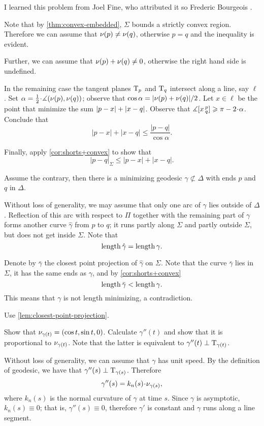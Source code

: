  I learned this problem from Joel Fine, who attributed it so Frederic Bourgeois \cite{fine}.

Note that by \ref{thm:convex-embedded}, $\Sigma$ bounds a strictly convex region.
Therefore we can assume that $\nu(p)\ne\nu(q)$, otherwise $p=q$ and the inequality is evident.

Further, we can assume that $\nu(p)+\nu(q)\ne 0$, otherwise the right hand side is undefined.


In the remaining case the tangent planes $\mathrm{T}_p$ and $\mathrm{T}_q$ intersect along a line, say $\ell$.
Set $\alpha=\tfrac12\cdot\measuredangle(\Norm(p),\Norm(q))$;
observe that $\cos\alpha= |\nu(p)+\nu(q)|/2$.
Let $x\in \ell$ be the point that minimize the sum $|p-x|\z+|x-q|$.
Observe that $\measuredangle\hinge xpq\ge \pi-2\cdot\alpha$.
Conclude that 
\[|p-x|+|x-q|\le \frac{|p-q|}{\cos\alpha}.\]

Finally, apply \ref{cor:shorts+convex} to show that
\[|p-q|_\Sigma\le |p-x|+|x-q|.\]


 Assume the contrary,
then there is a minimizing geodesic $\gamma\not\subset\Delta$ with ends $p$ and $q$ in $\Delta$.

Without loss of generality, we may assume that only one arc of $\gamma$ lies outside of $\Delta$.
Reflection of this arc  with respect to $\Pi$ together with the remaining part of $\gamma$ forms another curve $\hat\gamma$ from $p$ to $q$;
it runs partly along $\Sigma$ 
and partly outside $\Sigma$,
but does not get inside $\Sigma$.
Note that
\[\mathop{\rm length}\nolimits\hat\gamma=\mathop{\rm length}\nolimits\gamma.\]


Denote by $\bar\gamma$ the closest point projection of $\hat\gamma$ on $\Sigma$.
Note that the curve $\bar\gamma$ lies in $\Sigma$, 
it has the same ends as $\gamma$,
and by \ref{cor:shorts+convex}
\[\mathop{\rm length}\nolimits\bar\gamma<\mathop{\rm length}\nolimits\gamma.\]
This means that $\gamma$ is not length minimizing, 
a contradiction.

 Use \ref{lem:closest-point-projection}.

Show that $\nu_{\gamma(t)}=(\cos t,\sin t, 0)$.
Calculate $\gamma''(t)$ and show that it is proportional to $\nu_{\gamma(t)}$.
Note that the latter is equivalent to $\gamma''(t)\perp\mathrm{T}_{\gamma(t)}$.

 Without loss of generality, we can assume that $\gamma$ has unit speed.
By the definition of geodesic, we have that $\gamma''(s)\perp\mathrm{T}_{\gamma(s)}$. 
Therefore 
\[\gamma''(s)=k_n(s)\cdot\Norm_{\gamma(s)},\]
where $k_n(s)$ is the normal curvature of $\gamma$ at time $s$.
Since $\gamma$ is asymptotic, $k_n(s)\equiv 0$;
that is, $\gamma''(s)\equiv 0$, therefore $\gamma'$ is constant and $\gamma$ runs along a line segment.

